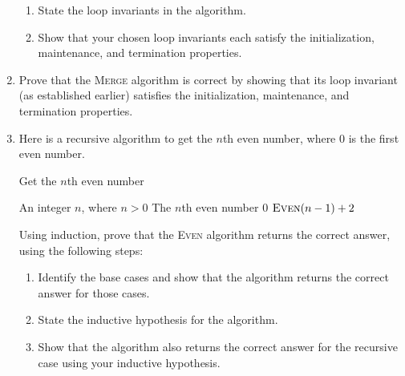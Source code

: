 \begin{exercises}
\begin{enumerate}
        \begin{enumerate}
            \item State the loop invariants in the algorithm.
            \item Show that your chosen loop invariants each satisfy the initialization, maintenance, and termination properties.
        \end{enumerate}

    \item[\challenge] Prove that the \textsc{Merge} algorithm is correct by showing that its loop invariant (as established earlier) satisfies the initialization, maintenance, and termination properties.

    \item Here is a recursive algorithm to get the $n$th even number, where $0$ is the first even number.
    \begin{algorithm}[H]
        \caption{Get the $n$th even number}
        \begin{algorithmic}[1]
            \Require An integer $n$, where $n>0$
            \Ensure The $n$th even number
                    \Return $0$
                \Else
                    \Return $\text{\Call{Even}{$n-1$}} + 2$
                \EndIf
            \EndFunction
        \end{algorithmic}
    \end{algorithm}
        Using induction, prove that the \textsc{Even} algorithm returns the correct answer, using the following steps:
        \begin{enumerate}
            \item Identify the base cases and show that the algorithm returns the correct answer for those cases.
            \item State the inductive hypothesis for the algorithm.
            \item Show that the algorithm also returns the correct answer for the recursive case using your inductive hypothesis.
        \end{enumerate}


\end{enumerate}
\end{exercises}
